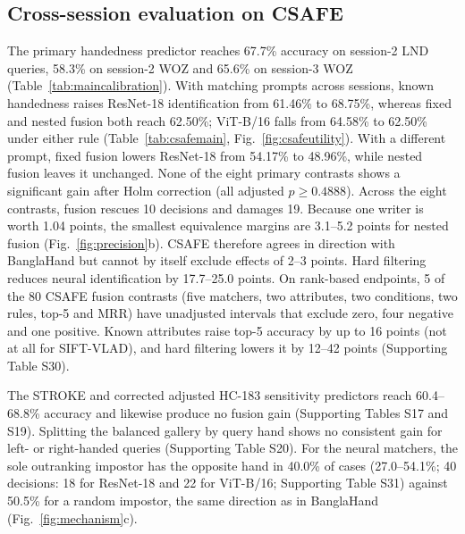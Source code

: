 \subsection{Cross-session evaluation on CSAFE}
\label{sec:csafeexternal}
The primary handedness predictor reaches 67.7\% accuracy on session-2 LND queries, 58.3\% on session-2 WOZ and 65.6\% on session-3 WOZ (Table~\ref{tab:maincalibration}). With matching prompts across sessions, known handedness raises ResNet-18 identification from 61.46\% to 68.75\%, whereas fixed and nested fusion both reach 62.50\%; ViT-B/16 falls from 64.58\% to 62.50\% under either rule (Table~\ref{tab:csafemain}, Fig.~\ref{fig:csafeutility}). With a different prompt, fixed fusion lowers ResNet-18 from 54.17\% to 48.96\%, while nested fusion leaves it unchanged. None of the eight primary contrasts shows a significant gain after Holm correction (all adjusted $p\geq0.4888$). Across the eight contrasts, fusion rescues 10 decisions and damages 19. Because one writer is worth 1.04 points, the smallest equivalence margins are 3.1--5.2 points for nested fusion (Fig.~\ref{fig:precision}b). CSAFE therefore agrees in direction with BanglaHand but cannot by itself exclude effects of 2--3 points. Hard filtering reduces neural identification by 17.7--25.0 points. On rank-based endpoints, 5 of the 80 CSAFE fusion contrasts (five matchers, two attributes, two conditions, two rules, top-5 and MRR) have unadjusted intervals that exclude zero, four negative and one positive. Known attributes raise top-5 accuracy by up to 16 points (not at all for SIFT-VLAD), and hard filtering lowers it by 12--42 points (Supporting Table S30).

The STROKE and corrected adjusted HC-183 sensitivity predictors reach 60.4--68.8\% accuracy and likewise produce no fusion gain (Supporting Tables S17 and S19). Splitting the balanced gallery by query hand shows no consistent gain for left- or right-handed queries (Supporting Table S20). For the neural matchers, the sole outranking impostor has the opposite hand in 40.0\% of cases (27.0--54.1\%; 40 decisions: 18 for ResNet-18 and 22 for ViT-B/16; Supporting Table S31) against 50.5\% for a random impostor, the same direction as in BanglaHand (Fig.~\ref{fig:mechanism}c).

